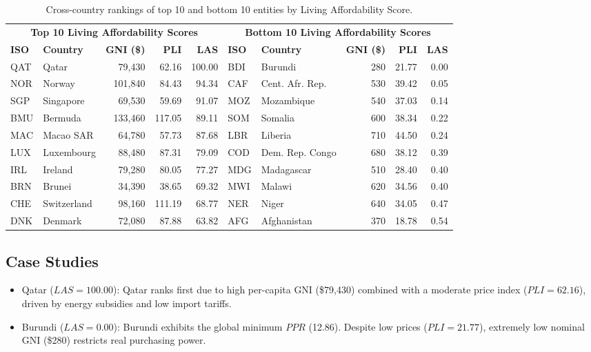 \documentclass[11pt,a4paper]{article}
\begin{document}
\begin{table}[h]
\centering
\small
\begin{tabular}{@{}llrrr|llrrr@{}}
\toprule
\multicolumn{5}{c|}{\textbf{Top 10 Living Affordability Scores}} & \multicolumn{5}{c}{\textbf{Bottom 10 Living Affordability Scores}} \\
\textbf{ISO} & \textbf{Country} & \textbf{GNI (\$)} & \textbf{PLI} & \textbf{LAS} & \textbf{ISO} & \textbf{Country} & \textbf{GNI (\$)} & \textbf{PLI} & \textbf{LAS} \\
\midrule
QAT & Qatar & 79,430 & 62.16 & 100.00 & BDI & Burundi & 280 & 21.77 & 0.00 \\
NOR & Norway & 101,840 & 84.43 & 94.34 & CAF & Cent. Afr. Rep. & 530 & 39.42 & 0.05 \\
SGP & Singapore & 69,530 & 59.69 & 91.07 & MOZ & Mozambique & 540 & 37.03 & 0.14 \\
BMU & Bermuda & 133,460 & 117.05 & 89.11 & SOM & Somalia & 600 & 38.34 & 0.22 \\
MAC & Macao SAR & 64,780 & 57.73 & 87.68 & LBR & Liberia & 710 & 44.50 & 0.24 \\
LUX & Luxembourg & 88,480 & 87.31 & 79.09 & COD & Dem. Rep. Congo & 680 & 38.12 & 0.39 \\
IRL & Ireland & 79,280 & 80.05 & 77.27 & MDG & Madagascar & 510 & 28.40 & 0.40 \\
BRN & Brunei & 34,390 & 38.65 & 69.32 & MWI & Malawi & 620 & 34.56 & 0.40 \\
CHE & Switzerland & 98,160 & 111.19 & 68.77 & NER & Niger & 640 & 34.05 & 0.47 \\
DNK & Denmark & 72,080 & 87.88 & 63.82 & AFG & Afghanistan & 370 & 18.78 & 0.54 \\
\bottomrule
\end{tabular}
\caption{Cross-country rankings of top 10 and bottom 10 entities by Living Affordability Score.}
\label{tab:rankings}
\end{table}

\subsection{Case Studies}
\begin{itemize}[leftmargin=1.5em]
    \item Qatar ($LAS = 100.00$): Qatar ranks first due to high per-capita GNI (\$79,430) combined with a moderate price index ($PLI = 62.16$), driven by energy subsidies and low import tariffs.
    \item Burundi ($LAS = 0.00$): Burundi exhibits the global minimum $PPR$ (12.86). Despite low prices ($PLI = 21.77$), extremely low nominal GNI (\$280) restricts real purchasing power.
\end{itemize}
\end{document}
